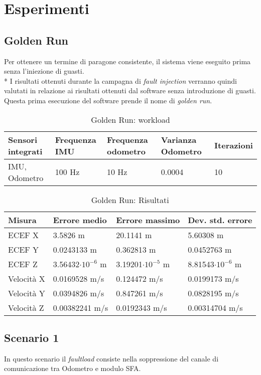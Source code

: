 \section{Esperimenti}
\subsection{Golden Run}
Per ottenere un termine di paragone consistente, il sistema viene eseguito prima senza l'iniezione di guasti.\\*
I risultati ottenuti durante la campagna di \emph{fault injection} verranno quindi valutati in relazione ai risultati ottenuti dal software senza introduzione di guasti. Questa prima esecuzione del software prende il nome di \emph{golden run}.
\begin{table}[h]
	\centering
	\begin{tabular}{|p{3.25cm}|p{2cm}|p{2cm}|p{2cm}|p{2cm}|}
		\hline 
		\textbf{Sensori integrati} & \textbf{Frequenza IMU}  & \textbf{Frequenza odometro} & \textbf{Varianza Odometro} & \textbf{Iterazioni} \\ 
		\hline 
		IMU, Odometro & 100 Hz & 10 Hz & 0.0004 & 10 \\
		\hline 
	\end{tabular}
	\caption{Golden Run: workload}
	\label{tab:exp12}
\end{table}
\begin{table}[h]
	\centering
	\begin{tabular}{|p{2cm}|p{3cm}|p{3cm}|p{3cm}|}
		\hline 
		\textbf{Misura} & \textbf{Errore medio}  & \textbf{Errore massimo} & \textbf{Dev. std. errore}\\ 
		\hline 
		ECEF X & 3.5826 m & 20.1141 m & 5.60308 m \\ 
		\hline 
		ECEF Y & 0.0243133 m & 0.362813 m & 0.0452763 m \\ 
		\hline 
		ECEF Z & 3.56432$\cdot10^{-6}$ m & 3.19201$\cdot10^{-5}$ m & 8.81543$\cdot10^{-6}$ m \\ 
		\hline 
		Velocit\`a X & 0.0169528 m/s & 0.124472 m/s & 0.0199173 m/s \\ 
		\hline 
		Velocit\`a Y & 0.0394826 m/s & 0.847261 m/s & 0.0828195 m/s \\ 
		\hline 
		Velocit\`a Z & 0.00382241 m/s & 0.0192343 m/s & 0.00314704 m/s \\ 
		\hline 
	\end{tabular}
	\caption{Golden Run: Risultati}
	\label{tab:exp12res}
\end{table}
\newpage
\subsection{Scenario 1}
In questo scenario il \emph{faultload} consiste nella soppressione del canale di comunicazione tra Odometro e modulo SFA.
